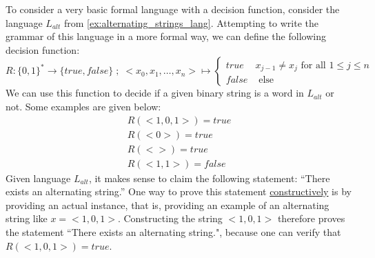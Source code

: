 \begin{example} To consider a very basic formal language with a decision function, consider the language $L_{alt}$ from \examplename{} \ref{ex:alternating_strings_lang}. Attempting to write the grammar of this language in a more formal way, we can define the following decision function:
$$
R: \{0,1\}^* \to \{true,false\}\;;\; <x_0,x_1,\ldots,x_n> \mapsto 
\begin{cases}
true & x_{j-1} \neq x_{j} \text{ for all } 1\leq j \leq n \\
false & \text{ else}
\end{cases}
$$
We can use this function to decide if a given binary string is a word in $L_{alt}$ or not. Some examples are given below:
$$
\begin{array}{l}
R(<1,0,1>)=true\\ 
R(<0>)=true\\
R(<>)=true\\ 
R(<1,1>)=false
\end{array} 
$$
Given language $L_{alt}$, it makes sense to claim the following statement: ``There exists an alternating string.'' One way to prove this statement \href{https://en.wikipedia.org/wiki/Constructive_proof}{constructively} is by providing an actual instance, that is, providing an example of an alternating string like $x = <1,0,1>$. Constructing the string $<1,0,1>$ therefore proves the statement ``There exists an alternating string.", because one can verify that $R(<1,0,1>)=true$.
\end{example}
